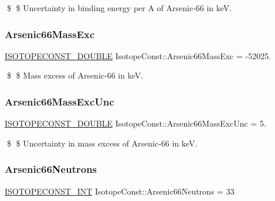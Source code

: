 \$ \$ Uncertainty in binding energy per A of Arsenic-\/66 in keV. \mbox{\label{group___isotope_const-_arsenic-_as66_ga39a55677b0769a4231b2c5edd9691b44}} 
\subsubsection{\texorpdfstring{Arsenic66\+Mass\+Exc}{Arsenic66MassExc}}
{\footnotesize\ttfamily \mbox{\hyperlink{group___isotope_const-_macros_ga8f45a7272ce02c0b4c65c44636ed719a}{I\+S\+O\+T\+O\+P\+E\+C\+O\+N\+S\+T\+\_\+\+D\+O\+U\+B\+LE}} Isotope\+Const\+::\+Arsenic66\+Mass\+Exc = -\/52025.}

\$ \$ Mass excess of Arsenic-\/66 in keV. \mbox{\label{group___isotope_const-_arsenic-_as66_ga0b773efed3aedeee0318fca58a92952e}} 
\subsubsection{\texorpdfstring{Arsenic66\+Mass\+Exc\+Unc}{Arsenic66MassExcUnc}}
{\footnotesize\ttfamily \mbox{\hyperlink{group___isotope_const-_macros_ga8f45a7272ce02c0b4c65c44636ed719a}{I\+S\+O\+T\+O\+P\+E\+C\+O\+N\+S\+T\+\_\+\+D\+O\+U\+B\+LE}} Isotope\+Const\+::\+Arsenic66\+Mass\+Exc\+Unc = 5.}

\$ \$ Uncertainty in mass excess of Arsenic-\/66 in keV. \mbox{\label{group___isotope_const-_arsenic-_as66_gafa5bcbfbc1d3c2072fc849fbc7b1b8a8}} 
\subsubsection{\texorpdfstring{Arsenic66\+Neutrons}{Arsenic66Neutrons}}
{\footnotesize\ttfamily \mbox{\hyperlink{group___isotope_const-_macros_ga5f18360b3e99483a35c32d789e62621c}{I\+S\+O\+T\+O\+P\+E\+C\+O\+N\+S\+T\+\_\+\+I\+NT}} Isotope\+Const\+::\+Arsenic66\+Neutrons = 33}


